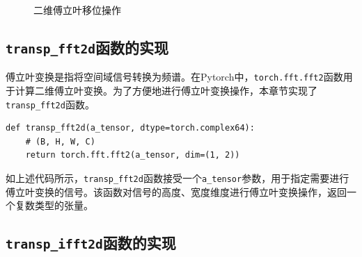 \begin{figure}[H]
    \centering
    \caption{二维傅立叶移位操作}
\end{figure}

\subsection{\texttt{transp\_fft2d}函数的实现}

傅立叶变换是指将空间域信号转换为频谱。在Pytorch中，\texttt{torch.fft.fft2}函数用于计算二维傅立叶变换。为了方便地进行傅立叶变换操作，本章节实现了\texttt{transp\_fft2d}函数。

\begin{lstlisting}[style=Python]
def transp_fft2d(a_tensor, dtype=torch.complex64):
    # (B, H, W, C)
    return torch.fft.fft2(a_tensor, dim=(1, 2))
\end{lstlisting}

如上述代码所示，\texttt{transp\_fft2d}函数接受一个\texttt{a\_tensor}参数，用于指定需要进行傅立叶变换的信号。该函数对信号的高度、宽度维度进行傅立叶变换操作，返回一个复数类型的张量。

\subsection{\texttt{transp\_ifft2d}函数的实现}

